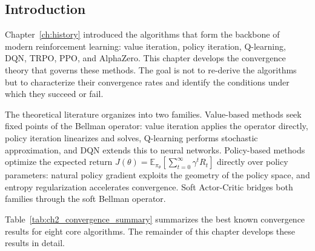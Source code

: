 
\subsection{Introduction}
\label{sec:ch2_intro}

Chapter~\ref{ch:history} introduced the algorithms that form the backbone of modern reinforcement learning: value iteration, policy iteration, Q-learning, DQN, TRPO, PPO, and AlphaZero. This chapter develops the convergence theory that governs these methods. The goal is not to re-derive the algorithms but to characterize their convergence rates and identify the conditions under which they succeed or fail.

The theoretical literature organizes into two families. Value-based methods seek fixed points of the Bellman operator: value iteration applies the operator directly, policy iteration linearizes and solves, Q-learning performs stochastic approximation, and DQN extends this to neural networks. Policy-based methods optimize the expected return $J(\theta) = \mathbb{E}_{\pi_\theta}[\sum_{t=0}^\infty \gamma^t R_t]$ directly over policy parameters: natural policy gradient exploits the geometry of the policy space, and entropy regularization accelerates convergence. Soft Actor-Critic bridges both families through the soft Bellman operator.

Table~\ref{tab:ch2_convergence_summary} summarizes the best known convergence results for eight core algorithms. The remainder of this chapter develops these results in detail.

